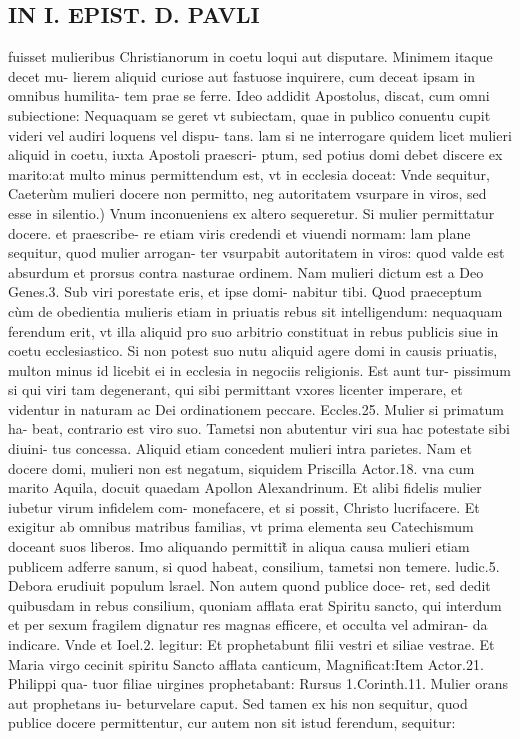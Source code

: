 \documentclass{article}
\begin{document}
\begin{pages}
\section*{IN I. EPIST. D. PAVLI }
\marginpar{[ p.72 ]}\pstart fuisset mulieribus Christianorum in coetu loqui aut disputare. Minimem itaque  decet mu- lierem aliquid curiose aut fastuose inquirere, cum deceat ipsam in omnibus humilita- tem prae se ferre. Ideo addidit Apostolus, discat, cum omni subiectione: Nequaquam se geret vt subiectam, quae in publico conuentu cupit videri vel audiri loquens vel dispu- tans. lam si ne interrogare quidem licet mulieri aliquid in coetu, iuxta Apostoli praescri- ptum, sed potius domi debet discere ex marito:at multo minus permittendum est, vt in ecclesia doceat: Vnde sequitur,  \pend\pstart Caeterùm mulieri docere non permitto, neg autoritatem vsurpare in viros, sed esse in silentio.) Vnum inconueniens ex altero sequeretur. Si mulier permittatur docere. et praescribe- re etiam viris credendi et viuendi normam: lam plane sequitur, quod mulier arrogan- ter vsurpabit autoritatem in viros: quod valde est absurdum et prorsus contra nasturae ordinem. Nam mulieri dictum est a Deo Genes.3. Sub viri porestate eris, et ipse domi- nabitur tibi. Quod praeceptum cùm de obedientia mulieris etiam in priuatis rebus sit intelligendum: nequaquam ferendum erit, vt illa aliquid pro suo arbitrio constituat in rebus publicis siue in coetu ecclesiastico. Si non potest suo nutu aliquid agere domi in causis priuatis, multon minus id licebit ei in ecclesia in negociis religionis. Est aunt tur- pissimum si qui viri tam degenerant, qui sibi permittant vxores licenter imperare, et videntur in naturam ac Dei ordinationem peccare. Eccles.25. Mulier si primatum ha- beat, contrario est viro suo. Tametsi non abutentur viri sua hac potestate sibi diuini- tus concessa. Aliquid etiam concedent mulieri intra parietes. Nam et docere domi, mulieri non est negatum, siquidem Priscilla Actor.18. vna cum marito Aquila, docuit quaedam Apollon Alexandrinum. Et alibi fidelis mulier iubetur virum infidelem com- monefacere, et si possit, Christo lucrifacere. Et exigitur ab omnibus matribus  familias, vt prima elementa seu Catechismum doceant suos liberos. Imo aliquando permittit̃ in aliqua causa mulieri etiam publicem adferre sanum, si quod habeat, consilium, tametsi non temere. ludic.5. Debora erudiuit populum lsrael. Non autem quond publice doce- ret, sed dedit quibusdam in rebus consilium, quoniam afflata erat Spiritu sancto, qui interdum et per sexum fragilem dignatur res magnas efficere, et occulta vel admiran- da indicare. Vnde et Ioel.2. legitur: Et prophetabunt filii vestri et siliae vestrae. Et Maria virgo cecinit spiritu Sancto afflata canticum, Magnificat:Item Actor.21. Philippi qua- tuor filiae uirgines prophetabant: Rursus 1.Corinth.11. Mulier orans aut prophetans iu- beturvelare caput. Sed tamen ex his non sequitur, quod publice docere permittentur, cur autem non sit istud ferendum, sequitur:  \pend
{}
{}

\end{pages}
\end{document}
